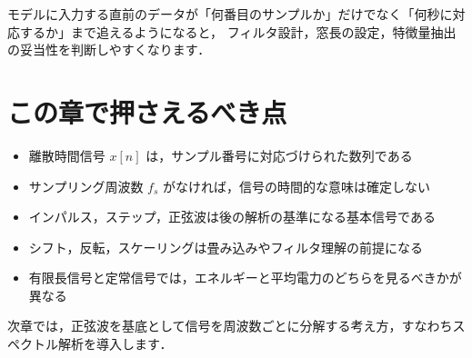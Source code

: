 モデルに入力する直前のデータが「何番目のサンプルか」だけでなく「何秒に対応するか」まで追えるようになると，
フィルタ設計，窓長の設定，特徴量抽出の妥当性を判断しやすくなります．


\section{この章で押さえるべき点}

\begin{itemize}
\item 離散時間信号 $x[n]$ は，サンプル番号に対応づけられた数列である
\item サンプリング周波数 $f_s$ がなければ，信号の時間的な意味は確定しない
\item インパルス，ステップ，正弦波は後の解析の基準になる基本信号である
\item シフト，反転，スケーリングは畳み込みやフィルタ理解の前提になる
\item 有限長信号と定常信号では，エネルギーと平均電力のどちらを見るべきかが異なる
\end{itemize}

次章では，正弦波を基底として信号を周波数ごとに分解する考え方，すなわちスペクトル解析を導入します．
